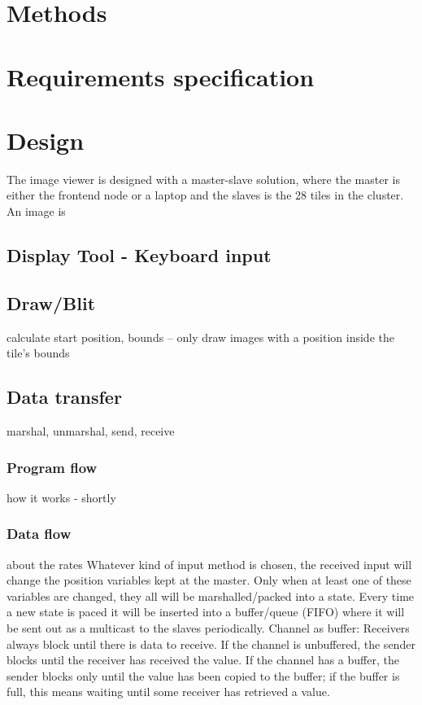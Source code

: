 \documentclass[12pt, a4paper, oneside]{article}
\begin{document}
\section{Methods}
\section{Requirements specification}

\section{Design}
The image viewer is designed with a master-slave solution, where the master is either the frontend node or a laptop and the slaves is the 28 tiles in the cluster. An image is 
\subsection{Display Tool - Keyboard input}
\subsection{Draw/Blit}
calculate start position, bounds – only draw images with a position inside the tile's bounds
\subsection{Data transfer}
marshal, unmarshal, send, receive
\subsubsection{Program flow}
how it works  - shortly
\subsubsection{Data flow}
about the rates\newline
Whatever kind of input method is chosen, the received input will change the position variables kept at the master. Only when at least one of these variables are changed, they all will be marshalled/packed into a state. Every time a new state is paced it will be inserted into a buffer/queue (FIFO)  where it will be sent out as a multicast to the slaves periodically.
\newline
\newline
Channel as buffer:
Receivers always block until there is data to receive. If the channel is unbuffered, the sender blocks until the receiver has received the value. If the channel has a buffer, the sender blocks only until the value has been copied to the buffer; if the buffer is full, this means waiting until some receiver has retrieved a value.
\end{document}
